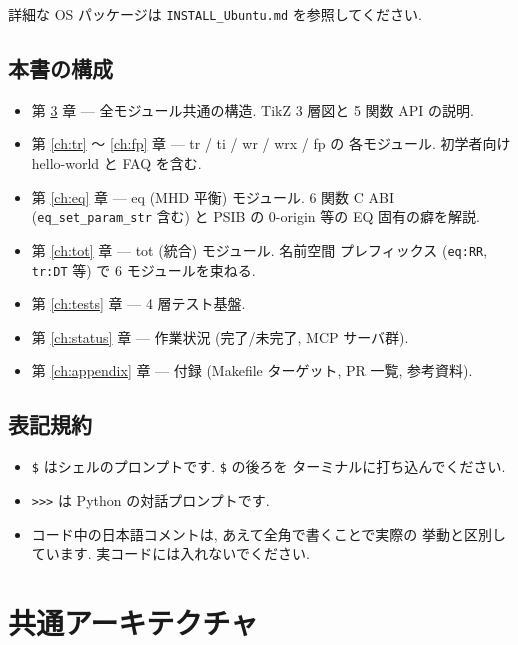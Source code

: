 \documentclass[11pt,a4paper]{report}
\begin{document}
詳細な OS パッケージは \texttt{INSTALL\_Ubuntu.md} を参照してください.

\section{本書の構成}

\begin{itemize}[leftmargin=1.5em]
  \item 第 \ref{ch:arch} 章 — 全モジュール共通の構造. TikZ 3 層図と
        5 関数 API の説明.
  \item 第 \ref{ch:tr} 〜 \ref{ch:fp} 章 — tr / ti / wr / wrx / fp の
        各モジュール. 初学者向け hello-world と FAQ を含む.
  \item 第 \ref{ch:eq} 章 — eq (MHD 平衡) モジュール. 6 関数 C ABI
        (\texttt{eq\_set\_param\_str} 含む) と PSIB の 0-origin 等の
        EQ 固有の癖を解説.
  \item 第 \ref{ch:tot} 章 — tot (統合) モジュール. 名前空間
        プレフィックス (\texttt{eq:RR}, \texttt{tr:DT} 等) で
        6 モジュールを束ねる.
  \item 第 \ref{ch:tests} 章 — 4 層テスト基盤.
  \item 第 \ref{ch:status} 章 — 作業状況 (完了/未完了, MCP サーバ群).
  \item 第 \ref{ch:appendix} 章 — 付録 (Makefile ターゲット, PR 一覧,
        参考資料).
\end{itemize}

\section{表記規約}

\begin{itemize}[leftmargin=1.5em]
  \item \texttt{\$} はシェルのプロンプトです. \texttt{\$} の後ろを
        ターミナルに打ち込んでください.
  \item \texttt{>>>} は Python の対話プロンプトです.
  \item コード中の日本語コメントは, あえて全角で書くことで実際の
        挙動と区別しています. 実コードには入れないでください.
\end{itemize}

\chapter{共通アーキテクチャ}
\label{ch:arch}
\end{document}
